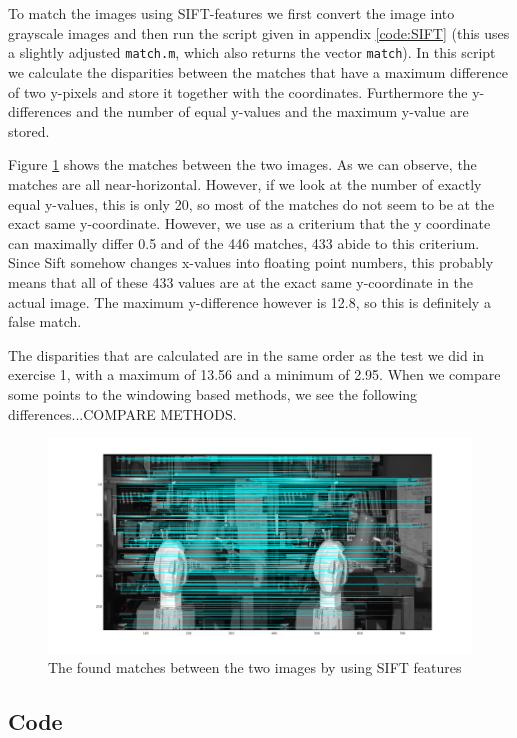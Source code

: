 \documentclass{article}
\begin{document}
\section{}
\section{}
\section{}
To match the images using SIFT-features we first convert the image into grayscale images and then run the script given in appendix \ref{code:SIFT} (this uses a slightly adjusted \texttt{match.m}, which also returns the vector \texttt{match}). In this script we calculate the disparities between the matches that have a maximum difference of two y-pixels and store it together with the coordinates. Furthermore the y-differences and the number of equal y-values and the maximum y-value are stored.

Figure \ref{matches} shows the matches between the two images. As we can observe, the matches are all near-horizontal. However, if we look at the number of exactly equal y-values, this is only 20, so most of the matches do not seem to be at the exact same y-coordinate. However, we use as a criterium that the y coordinate can maximally differ 0.5 and of the 446 matches, 433 abide to this criterium. Since Sift somehow changes x-values into floating point numbers, this probably means that all of these 433 values are at the exact same y-coordinate in the actual image. The maximum y-difference however is 12.8, so this is definitely a false match.

The disparities that are calculated are in the same order as the test we did in exercise 1, with a maximum of 13.56 and a minimum of 2.95. When we compare some points to the windowing based methods, we see the following differences...COMPARE METHODS.

\begin{figure}
 \centering
 \includegraphics[width = \linewidth]{matches.png}
 \caption{The found matches between the two images by using SIFT features}
 \label{matches}
\end{figure}

\begin{appendices}
\section{Code}

\end{appendices}
\end{document}
